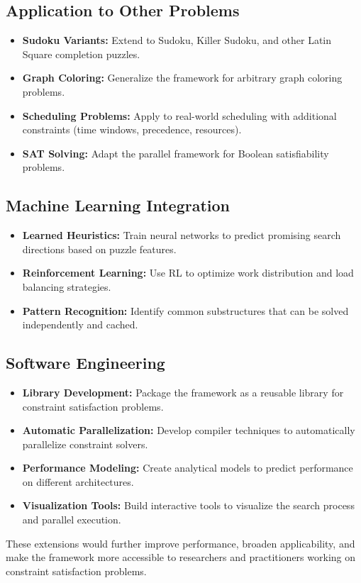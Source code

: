 \subsection{Application to Other Problems}
\begin{itemize}
    \item \textbf{Sudoku Variants:} Extend to Sudoku, Killer Sudoku, and other Latin Square completion puzzles.
    
    \item \textbf{Graph Coloring:} Generalize the framework for arbitrary graph coloring problems.
    
    \item \textbf{Scheduling Problems:} Apply to real-world scheduling with additional constraints (time windows, precedence, resources).
    
    \item \textbf{SAT Solving:} Adapt the parallel framework for Boolean satisfiability problems.
\end{itemize}

\subsection{Machine Learning Integration}
\begin{itemize}
    \item \textbf{Learned Heuristics:} Train neural networks to predict promising search directions based on puzzle features.
    
    \item \textbf{Reinforcement Learning:} Use RL to optimize work distribution and load balancing strategies.
    
    \item \textbf{Pattern Recognition:} Identify common substructures that can be solved independently and cached.
\end{itemize}

\subsection{Software Engineering}
\begin{itemize}
    \item \textbf{Library Development:} Package the framework as a reusable library for constraint satisfaction problems.
    
    \item \textbf{Automatic Parallelization:} Develop compiler techniques to automatically parallelize constraint solvers.
    
    \item \textbf{Performance Modeling:} Create analytical models to predict performance on different architectures.
    
    \item \textbf{Visualization Tools:} Build interactive tools to visualize the search process and parallel execution.
\end{itemize}

These extensions would further improve performance, broaden applicability, and make the framework more accessible to researchers and practitioners working on constraint satisfaction problems.